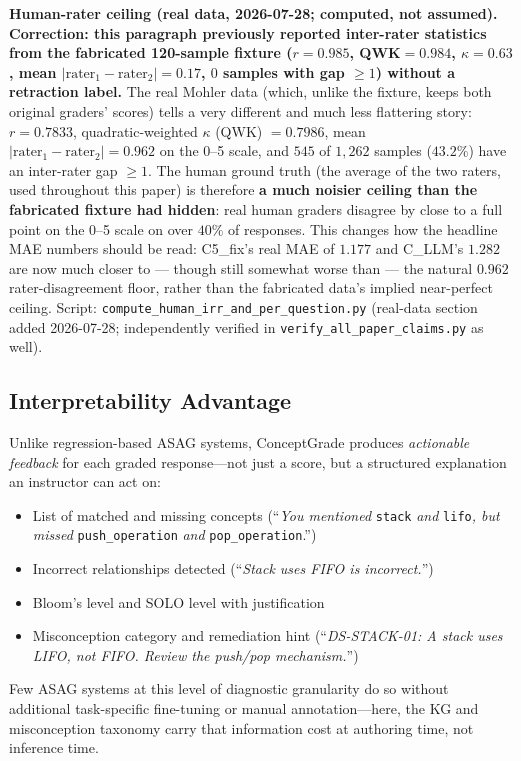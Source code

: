 \documentclass[conference]{IEEEtran}
\begin{document}
\textbf{Human-rater ceiling (real data, 2026-07-28; computed, not
assumed).} \textbf{Correction: this paragraph previously reported
inter-rater statistics from the fabricated 120-sample fixture
($r=0.985$, QWK$=0.984$, $\kappa=0.63$, mean
$|\text{rater}_1-\text{rater}_2|=0.17$, $0$ samples with gap $\geq 1$)
without a retraction label.} The real Mohler data (which, unlike the
fixture, keeps both original graders' scores) tells a very different
and much less flattering story: $r = 0.7833$, quadratic-weighted
$\kappa$ (QWK) $= 0.7986$, mean $|\text{rater}_1-\text{rater}_2| =
0.962$ on the 0--5 scale, and $545$ of $1{,}262$ samples ($43.2\%$)
have an inter-rater gap $\geq 1$. The human ground truth (the average
of the two raters, used throughout this paper) is therefore
\textbf{a much noisier ceiling than the fabricated fixture had hidden}:
real human graders disagree by close to a full point on the 0--5 scale
on over $40\%$ of responses. This changes how the headline MAE numbers
should be read: C5\_fix's real MAE of $1.177$ and C\_LLM's $1.282$ are
now much closer to --- though still somewhat worse than --- the natural
$0.962$ rater-disagreement floor, rather than the fabricated data's
implied near-perfect ceiling. Script:
\texttt{compute\_human\_irr\_and\_per\_question.py} (real-data section
added 2026-07-28; independently verified in
\texttt{verify\_all\_paper\_claims.py} as well).

\subsection{Interpretability Advantage}

Unlike regression-based ASAG systems, ConceptGrade produces \emph{actionable
feedback} for each graded response—not just a score, but a structured explanation
an instructor can act on:
\begin{itemize}
  \item List of matched and missing concepts (``\textit{You mentioned} \texttt{stack}
        \textit{and} \texttt{lifo}\textit{, but missed} \texttt{push\_operation}
        \textit{and} \texttt{pop\_operation}.'')
  \item Incorrect relationships detected (``\textit{Stack uses FIFO is incorrect.}'')
  \item Bloom's level and SOLO level with justification
  \item Misconception category and remediation hint (``\textit{DS-STACK-01: A stack
        uses LIFO, not FIFO. Review the push/pop mechanism.}'')
\end{itemize}
Few ASAG systems at this level of diagnostic granularity do so without
additional task-specific fine-tuning or manual annotation—here, the KG and
misconception taxonomy carry that information cost at authoring time, not
inference time.
\end{document}
